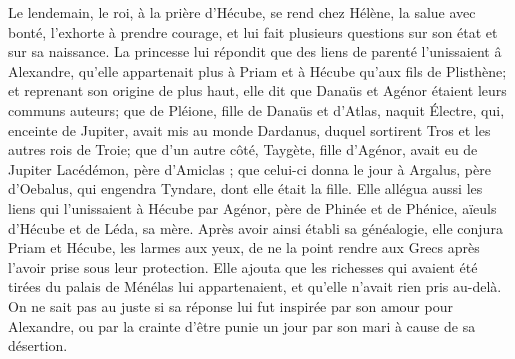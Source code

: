\documentclass{article}
\begin{document}
Le lendemain, le roi, à la prière d'Hécube, se rend chez Hélène, la salue avec bonté, l'exhorte à prendre courage, et lui fait plusieurs questions sur son état et sur sa naissance. La princesse lui répondit que des liens de parenté l'unissaient â Alexandre, qu'elle appartenait plus à Priam et à Hécube qu'aux fils de Plisthène; et reprenant son origine de plus haut, elle dit que Danaüs et Agénor étaient leurs communs auteurs; que de Pléione, fille de Danaüs et d'Atlas, naquit Électre, qui, enceinte de Jupiter, avait mis au monde Dardanus, duquel sortirent Tros et les autres rois de Troie; que d'un autre côté, Taygète, fille d'Agénor, avait eu de Jupiter Lacédémon, père d'Amiclas ; que celui-ci donna le jour à Argalus, père d'Oebalus, qui engendra Tyndare, dont elle était la fille. Elle allégua aussi les liens qui l'unissaient à Hécube par Agénor, père de Phinée et de Phénice, aïeuls d'Hécube et de Léda, sa mère. Après avoir ainsi établi sa généalogie, elle conjura Priam et Hécube, les larmes aux yeux, de ne la point rendre aux Grecs après l'avoir prise sous leur protection. Elle ajouta que les richesses qui avaient été tirées du palais de Ménélas lui appartenaient, et qu'elle n'avait rien pris au-delà. On ne sait pas au juste si sa réponse lui fut inspirée par son amour pour Alexandre, ou par la crainte d'être punie un jour par son mari à cause de sa désertion.
\pend
\endnumbering

\newpage
{}
\end{document}
